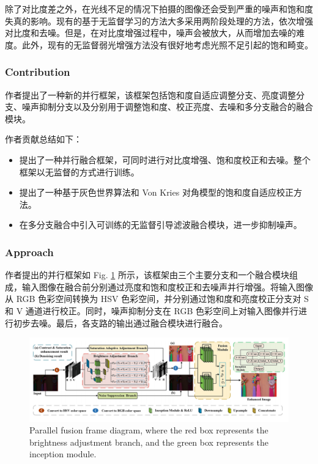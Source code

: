 \documentclass[a4paper]{ctexart}
\begin{document}
	除了对比度差之外，在光线不足的情况下拍摄的图像还会受到严重的噪声和饱和度失真的影响。现有的基于无监督学习的方法大多采用两阶段处理的方法，依次增强对比度和去噪。但是，在对比度增强过程中，噪声会被放大，从而增加去噪的难度。此外，现有的无监督弱光增强方法没有很好地考虑光照不足引起的饱和畸变。
	
	\subsubsection{Contribution}
	
	作者提出了一种新的并行框架，该框架包括饱和度自适应调整分支、亮度调整分支、噪声抑制分支以及分别用于调整饱和度、校正亮度、去噪和多分支融合的融合模块。
	
	作者贡献总结如下：
	
	\begin{itemize}
		\item[(1)] 
		提出了一种并行融合框架，可同时进行对比度增强、饱和度校正和去噪。整个框架以无监督的方式进行训练。
		
		\item[(2)]
		提出了一种基于灰色世界算法和 Von Kries 对角模型的饱和度自适应校正方法。
		
		\item[(3)]
		在多分支融合中引入可训练的无监督引导滤波融合模块，进一步抑制噪声。
		
	\end{itemize}	
	
	\subsubsection{Approach}
	
	作者提出的并行框架如 Fig. \ref{fig: Parallel fusion frame diagram} 所示，该框架由三个主要分支和一个融合模块组成，输入图像在融合前分别通过亮度和饱和度校正和去噪声并行增强。将输入图像从 RGB 色彩空间转换为 HSV 色彩空间，并分别通过饱和度和亮度校正分支对 S 和 V 通道进行校正。同时，噪声抑制分支在 RGB 色彩空间上对输入图像并行进行初步去噪。最后，各支路的输出通过融合模块进行融合。
	
	\begin{figure}[htbp]
		\centering 
		\includegraphics[width=\columnwidth]{picture/LLIE/Fusion-Based LLIE/Parallel fusion frame diagram}
		\caption{
			\label{fig: Parallel fusion frame diagram} 
			Parallel fusion frame diagram, where the red box represents the brightness adjustment branch, and the green box represents the inception module. 
		}
	\end{figure}
	
\end{document}
